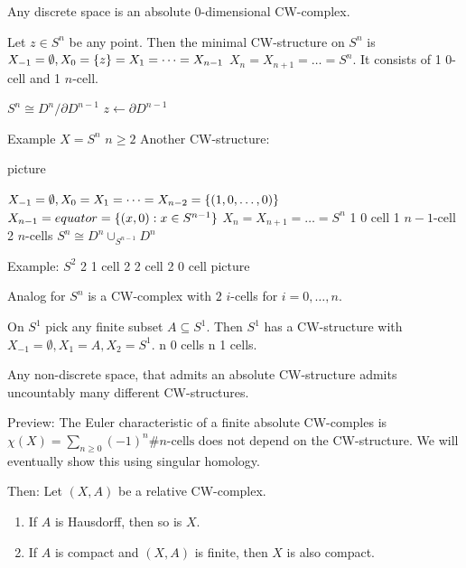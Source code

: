\documentclass{TemplateLecture}
\begin{document}
\begin{example}
    Any discrete space is an absolute \(0\)-dimensional CW-complex.

    Let \(z \in S^n\) be any point. Then  the minimal CW-structure on \(S^n\) is \(X_{-1} = \emptyset, X_0 = \{z\} = X_1 = \dots = X_{n-1}\) \(X_n = X_{n+1} = \dots = S^n\). It consists of 1 \(0\)-cell and 1 \(n\)-cell. 

    \(S^n \cong D^n / \partial D^{n-1}\) \(z \leftarrow \partial D^{n-1}\)

    Example \(X = S^n\) \(n \geq 2\) Another CW-structure:

    picture

    \(X_{-1} = \emptyset, X_0 = X_1 = \dots = X_{n-2} = \{(1,0,\dots, 0)\}\) \(X_{n-1} = equator = \{(x,0) : x \in S^{n-1}\}\)
    \(X_n = X_{n+1} = \dots = S^n\)
    1 0 cell 1  \(n-1\)-cell 2 \(n\)-cells
    \(S^n \cong D^n \cup_{S^{n-1}} D^n\)

    Example: \(S^2\) 2 1 cell 2 2 cell 2 0 cell 
    picture

    Analog for \(S^n\) is a CW-complex with \(2\) \(i\)-cells for \(i = 0, \dots, n\).

    On \(S^1\) pick any finite subset \(A \subseteq S^1\). Then \(S^1\) has a CW-structure with \(X_{-1} = \emptyset, X_1 = A, X_2 = S^1\). n 0 cells n 1 cells.

    Any non-discrete space, that admits an absolute CW-structure admits uncountably many different CW-structures.

    Preview: The Euler characteristic of a finite absolute CW-comples is \(\chi(X) = \sum_{n \geq 0} (-1)^n \#n\text{-cells}\) does not depend on the CW-structure. We will eventually show this using singular homology. 
\end{example}

Then: Let \((X,A)\) be a relative CW-complex.
\begin{enumerate}
    \item If \(A\) is Hausdorff, then so is \(X\).
    \item If \(A\) is compact and \((X,A)\) is finite, then \(X\) is also compact.
\end{enumerate}
\end{document}

